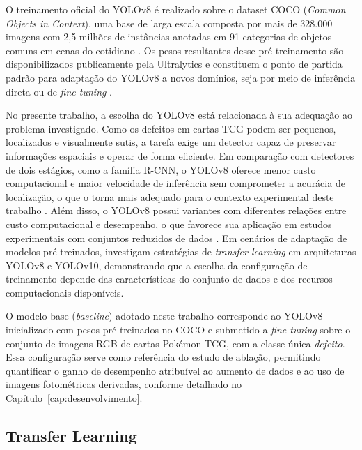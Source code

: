 \documentclass[
    12pt,                %
    openright,           %
    oneside,             %
    a4paper,             %
    english,             %
    brazil               %
]{abntex2}
\begin{document}
O treinamento oficial do YOLOv8 é realizado sobre o dataset COCO
(\textit{Common Objects in Context}), uma base de larga escala composta por
mais de 328.000 imagens com 2,5 milhões de instâncias anotadas em 91 categorias
de objetos comuns em cenas do cotidiano \cite{Lin2014}. Os pesos resultantes
desse pré-treinamento são disponibilizados publicamente pela Ultralytics e
constituem o ponto de partida padrão para adaptação do YOLOv8 a novos domínios,
seja por meio de inferência direta ou de \textit{fine-tuning} \cite{Dobrzycki2025,
Situ2023}.

No presente trabalho, a escolha do YOLOv8 está relacionada à sua 
adequação ao problema investigado. Como os defeitos em cartas TCG 
podem ser pequenos, localizados e visualmente sutis, a tarefa exige 
um detector capaz de preservar informações espaciais e operar de 
forma eficiente. Em comparação com detectores de dois estágios, como 
a família R-CNN, o YOLOv8 oferece menor custo computacional e maior 
velocidade de inferência sem comprometer a acurácia de localização, 
o que o torna mais adequado para o contexto experimental deste 
trabalho \cite{Situ2023, Hussain2023}. Além disso, o YOLOv8 possui 
variantes com diferentes relações entre custo computacional e 
desempenho, o que favorece sua aplicação em estudos experimentais 
com conjuntos reduzidos de dados \cite{Ramos2025}. Em cenários de 
adaptação de modelos pré-treinados,  
investigam estratégias de \textit{transfer learning} em arquiteturas 
YOLOv8 e YOLOv10, demonstrando que a escolha da configuração de 
treinamento depende das características do conjunto de dados e dos 
recursos computacionais disponíveis.

O modelo base (\textit{baseline}) adotado neste trabalho 
corresponde ao YOLOv8 inicializado com pesos pré-treinados 
no COCO e submetido a \textit{fine-tuning} sobre o conjunto 
de imagens RGB de cartas Pokémon TCG, com a classe única 
\textit{defeito}. Essa configuração serve como referência 
do estudo de ablação, permitindo quantificar o ganho de 
desempenho atribuível ao aumento de dados e ao uso de 
imagens fotométricas derivadas, conforme detalhado no 
Capítulo~\ref{cap:desenvolvimento}.


\subsection{Transfer Learning}
\label{subsec:transfer_learning}
\end{document}
